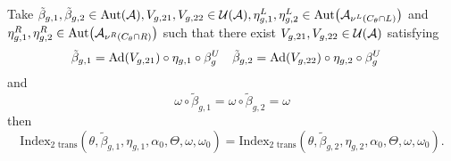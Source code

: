 \documentclass[11pt,a4paper,twoside]{article}
\numberwithin{equation}{section}
\begin{document}
\begin{lemma}\label{lem:InvarianceUnderChoiceBetaTwoTranslations}
	Take $\tilde{\beta}_{g,1},\tilde{\beta}_{g,2}\in\Aut{\AA},V_{g,21},V_{g,22}\in\UU(\AA),\eta_{g,1}^L,\eta_{g,2}^L\in \Aut{\AA_{\nu^{L}(C_\theta\cap L)}}$ and $\eta_{g,1}^R,\eta_{g,2}^R\in \Aut{\AA_{\nu^{R}(C_\theta\cap R)}}$ such that there exist $V_{g,21},V_{g,22}\in\mathcal U(\mathcal A)$ satisfying
	\begin{align}\label{eq:InvarianceUnderChoiceBetaTwoBetasTwoTranslations}
		\tilde{\beta}_{g,1}&=\Ad{V_{g,21}}\circ\eta_{g,1}\circ\beta^U_g&\tilde{\beta}_{g,2}&=\Ad{V_{g,22}}\circ\eta_{g,2}\circ\beta^U_g
	\end{align}
	and
	\begin{equation}
		\omega\circ\tilde{\beta}_{g,1}=\omega\circ\tilde{\beta}_{g,2}=\omega
	\end{equation}
	then
	\begin{equation}
		\textrm{Index}_{\text{2 trans}}(\theta,\tilde{\beta}_{g,1},\eta_{g,1},\alpha_{0},\Theta,\omega,\omega_0)=\textrm{Index}_{\text{2 trans}}(\theta,\tilde{\beta}_{g,2},\eta_{g,2},\alpha_{0},\Theta,\omega,\omega_0).
	\end{equation}
\end{lemma}
\end{document}
